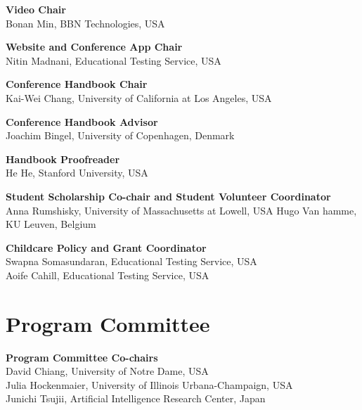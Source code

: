 {\bf Video Chair}\\
Bonan Min, BBN Technologies, USA

{\bf Website and Conference App Chair}\\
Nitin Madnani, Educational Testing Service, USA


{\bf Conference Handbook Chair}\\
Kai-Wei Chang, University of California at Los Angeles, USA

{\bf Conference Handbook Advisor}\\
Joachim Bingel, University of Copenhagen, Denmark

{\bf Handbook Proofreader}\\
He He, Stanford University, USA


{\bf Student Scholarship Co-chair and Student Volunteer Coordinator}\\
Anna Rumshisky, University of Massachusetts at Lowell, USA
Hugo Van hamme, KU Leuven, Belgium  

{\bf Childcare Policy and Grant Coordinator }\\
Swapna Somasundaran, Educational Testing Service, USA \\
Aoife Cahill, Educational Testing Service, USA



\clearpage
\section{Program Committee}
\setlength{\parindent}{0pt}

\vspace*{0.5cm}

{\bf Program Committee Co-chairs} \\
David Chiang, University of Notre Dame, USA \\
Julia Hockenmaier, University of Illinois Urbana-Champaign, USA \\
Junichi Tsujii, Artificial Intelligence Research Center, Japan

